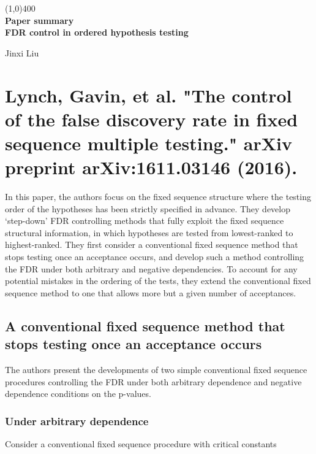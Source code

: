\documentclass{article}
\begin{document}
	
	\begin{titlepage}
		\begin{center}
			\line(1,0){400}\\
			[3mm]
			\huge{\bfseries Paper summary}\\
				[3mm]
				\large{\bfseries FDR control in ordered hypothesis testing}
		\end{center}
		
		
	
	
		
		\begin{flushright}
			\LARGE{Jinxi Liu}
		\end{flushright}
		
	\end{titlepage}

\tableofcontents
\cleardoublepage

\section{Lynch, Gavin, et al. "The control of the false discovery rate in fixed sequence multiple testing." arXiv preprint arXiv:1611.03146 (2016).}
In this paper, the authors focus on the fixed sequence structure where the testing order of the hypotheses has been strictly specified in advance. They develop ‘step-down’ FDR controlling methods that fully exploit the fixed sequence structural information, in which hypotheses are tested from lowest-ranked
to highest-ranked. They first consider a conventional fixed sequence method that stops testing once an acceptance occurs, and develop such a method controlling the FDR under both arbitrary and negative dependencies. To account for any potential mistakes in the ordering of the tests, they extend the conventional fixed sequence method to one that allows more but a given number of acceptances.

\subsection{A conventional fixed sequence method that stops testing once an acceptance occurs}
The authors present the developments of two simple conventional fixed sequence procedures controlling the FDR under both arbitrary dependence and negative dependence conditions on the p-values.

\subsubsection{Under arbitrary dependence}
Consider a conventional fixed sequence procedure with critical constants
\end{document}
